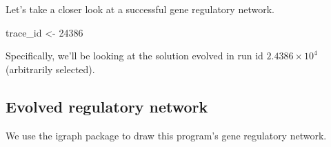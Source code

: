 \documentclass[
]{book}
\newenvironment{Shaded}{\begin{snugshade}}{\end{snugshade}}
\newcommand{\DecValTok}[1]{\textcolor[rgb]{0.00,0.00,0.81}{#1}}
\newcommand{\NormalTok}[1]{#1}
\newcommand{\StringTok}[1]{\textcolor[rgb]{0.31,0.60,0.02}{#1}}
\begin{document}
Let's take a closer look at a successful gene regulatory network.

\begin{Shaded}
\begin{Highlighting}[]
\NormalTok{trace\_id \textless{}{-}}\StringTok{ }\DecValTok{24386}
\end{Highlighting}
\end{Shaded}

Specifically, we'll be looking at the solution evolved in run id \ensuremath{2.4386\times 10^{4}} (arbitrarily selected).

\hypertarget{evolved-regulatory-network-2}{%
\subsection{Evolved regulatory network}\label{evolved-regulatory-network-2}}

We use the igraph package to draw this program's gene regulatory network.
\end{document}
